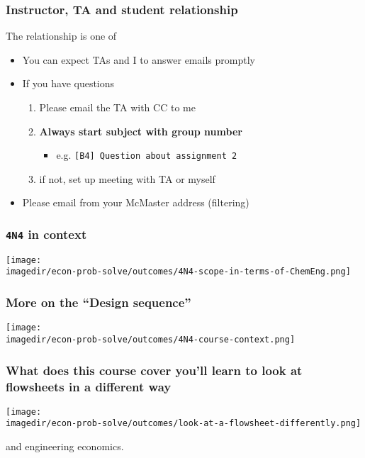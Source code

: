 \begin{frame}\frametitle{Instructor, TA and student relationship}
	\begin{exampleblock}{}
		The relationship is one of {}
	\end{exampleblock}

	\begin{itemize}
		\item	You can expect TAs and I to answer emails promptly
		\item	If you have questions
			\begin{enumerate}
				\item	Please email the TA with CC to me \hfill {\tiny{\color{myOrange}{$\longleftarrow$ hopefully this solves your problem}}}
				\item	\textbf{Always start subject with group number}
				\begin{itemize}
					\item	e.g. \texttt{[B4] Question about assignment 2}
				\end{itemize}
				\item	if not, set up meeting with TA or myself
			\end{enumerate}
		\item	Please email from your McMaster address (filtering)
	\end{itemize}
\end{frame}

\begin{frame}\frametitle{\texttt{4N4} in context}
	\begin{center}
		\texttt{[image: \\imagedir/econ-prob-solve/outcomes/4N4-scope-in-terms-of-ChemEng.png]}
	\end{center}
\end{frame}

\begin{frame}\frametitle{More on the ``Design sequence''}
	\begin{center}
		\texttt{[image: \\imagedir/econ-prob-solve/outcomes/4N4-course-context.png]}
	\end{center}
\end{frame}

\begin{frame}\frametitle{What does this course cover {\scriptsize you'll learn to look at flowsheets in a different way}}
	\begin{center}
		\texttt{[image: \\imagedir/econ-prob-solve/outcomes/look-at-a-flowsheet-differently.png]}
	\end{center}
	and engineering economics.
\end{frame}

